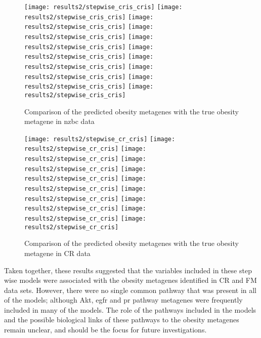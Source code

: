 \begin{figure}[htpb]
	\centering
	\texttt{[image: results2/stepwise\_cris\_cris]}
	\texttt{[image: results2/stepwise\_cris\_cris]}
	\texttt{[image: results2/stepwise\_cris\_cris]}
	\texttt{[image: results2/stepwise\_cris\_cris]}
	\texttt{[image: results2/stepwise\_cris\_cris]}
	\texttt{[image: results2/stepwise\_cris\_cris]}
	\texttt{[image: results2/stepwise\_cris\_cris]}
	\texttt{[image: results2/stepwise\_cris\_cris]}
	\texttt{[image: results2/stepwise\_cris\_cris]}
	\texttt{[image: results2/stepwise\_cris\_cris]}
	\caption{Comparison of the predicted obesity metagenes with the true obesity metagene in \gls{nzbc} data}
	\label{fig:stepwise_cris}
\end{figure}

\begin{figure}[htpb]
	\centering
	\texttt{[image: results2/stepwise\_cr\_cris]}
	\texttt{[image: results2/stepwise\_cr\_cris]}
	\texttt{[image: results2/stepwise\_cr\_cris]}
	\texttt{[image: results2/stepwise\_cr\_cris]}
	\texttt{[image: results2/stepwise\_cr\_cris]}
	\texttt{[image: results2/stepwise\_cr\_cris]}
	\texttt{[image: results2/stepwise\_cr\_cris]}
	\texttt{[image: results2/stepwise\_cr\_cris]}
	\texttt{[image: results2/stepwise\_cr\_cris]}
	\texttt{[image: results2/stepwise\_cr\_cris]}
	\caption{Comparison of the predicted obesity metagenes with the true obesity metagene in CR data}
	\label{fig:stepwise_cr}
\end{figure}

Taken together, these results suggested that the variables included in these step wise models were associated with the obesity metagenes identified in CR and FM data sets.
However, there were no single common pathway that was present in all of the models; although Akt, \gls{egfr} and \gls{pr} pathway metagenes were frequently included in many of the models.
The role of the pathways included in the models and the possible biological links of these pathways to the obesity metagenes remain unclear, and should be the focus for future investigations.

